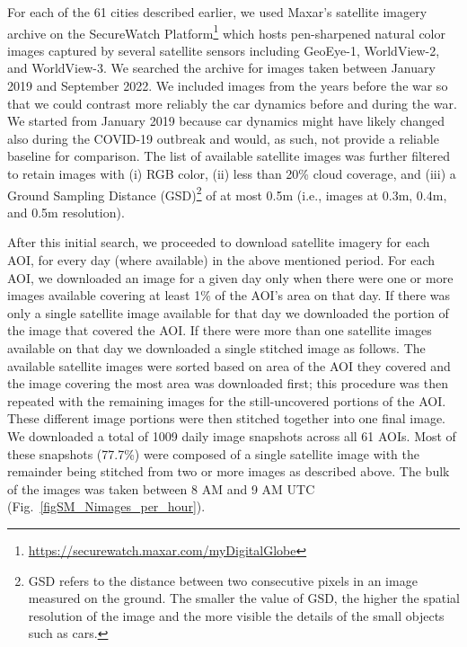 \documentclass[sn-basic]{sn-jnl}%
\begin{document}

For each of the 61 cities described earlier, we used Maxar's satellite imagery archive on the SecureWatch Platform\footnote{\url{https://securewatch.maxar.com/myDigitalGlobe}} which hosts pen-sharpened natural color images captured by several satellite sensors including GeoEye-1, WorldView-2, and WorldView-3. We searched the archive for images taken between January 2019 and September 2022.  We included images from the years before the war so that we could contrast more reliably the car dynamics before and during the war. We started from January 2019 because car dynamics might have likely changed also during the COVID-19 outbreak and would, as such, not provide a reliable baseline for comparison. The list of available satellite images was further filtered to retain images with (i) RGB color, (ii) less than 20\% cloud coverage, and (iii) a Ground Sampling Distance (GSD)\footnote{GSD refers to the distance between two consecutive pixels in an image measured on the ground. The smaller the value of GSD, the higher the spatial resolution of the image and the more visible the details of the small objects such as cars.} of at most 0.5m (i.e., images at 0.3m, 0.4m, and 0.5m resolution).

After this initial search, we proceeded to download satellite imagery for each AOI, for every day (where available) in the above mentioned period. For each AOI, we downloaded an image for a given day only when there were one or more images available covering at least 1\% of the AOI's area on that day. If there was only a single satellite image available for that day we downloaded the portion of the image that covered the AOI. If there were more than one satellite images available on that day we downloaded a single stitched image as follows. The available satellite images were sorted based on area of the AOI they covered and the image covering the most area was downloaded first; this procedure was then repeated with the remaining images for the still-uncovered portions of the AOI. These different image portions were then stitched together into one final image. We downloaded a total of 1009 daily image snapshots across all 61 AOIs. Most of these snapshots (77.7\%) were composed of a single satellite image with the remainder being stitched from two or more images as described above. The bulk of the images was taken between 8 AM and 9 AM UTC (Fig.~\ref{figSM_Nimages_per_hour}). 
\end{document}
